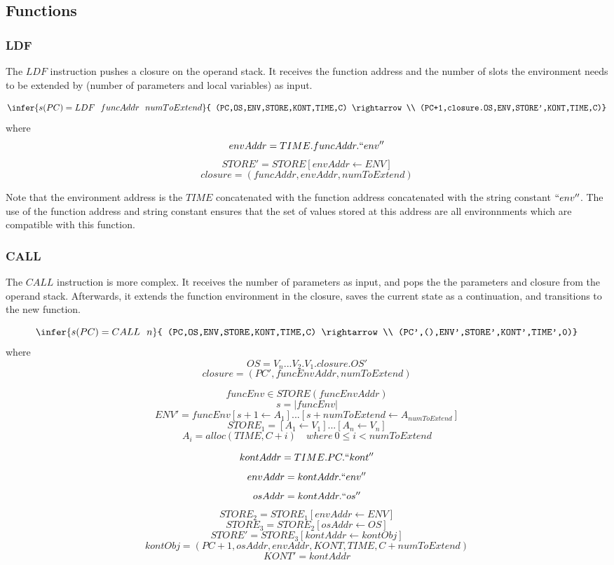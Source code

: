 \documentclass[12pt]{article}
\begin{document}
\subsection{Functions}
\subsubsection{LDF}
The $LDF$ instruction pushes a closure on the operand stack. It receives the function address and the number of slots the environment needs to be extended by (number of parameters and local variables) as input.

$$\infer{s(PC) = LDF\ \ funcAddr\ \ numToExtend}{
    (PC,OS,ENV,STORE,KONT,TIME,C) \rightarrow \\
    (PC+1,closure.OS,ENV,STORE',KONT,TIME,C)}$$
where
$$envAddr=TIME.funcAddr.``env''$$
$$STORE'=STORE[envAddr \leftarrow ENV]$$
$$closure=(funcAddr,envAddr,numToExtend)$$

Note that the environment address is the $TIME$ concatenated with the function address concatenated with the string constant $``env''$. The use of the function address and string constant ensures that the set of values stored at this address are all environnments which are compatible with this function.

\subsubsection{CALL}
The $CALL$ instruction is more complex. It receives the number of parameters as input, and pops the the parameters and closure from the operand stack. Afterwards, it extends the function environment in the closure, saves the current state as a continuation, and transitions to the new function.

$$\infer{s(PC) = CALL\ \ n}{
    (PC,OS,ENV,STORE,KONT,TIME,C) \rightarrow \\
    (PC',(),ENV',STORE',KONT',TIME',0)}$$
where
$$OS=V_n...V_2.V_1.closure.OS'$$
$$closure=(PC',funcEnvAddr,numToExtend)$$

$$funcEnv \in STORE(funcEnvAddr)$$
$$s=|funcEnv|$$
$$ENV'=funcEnv[s+1 \leftarrow A_1]...[s+numToExtend \leftarrow A_{numToExtend}]$$
$$STORE_1=[A_1 \leftarrow V_1]...[A_n \leftarrow V_n]$$
$$A_i=alloc(TIME,C+i) \quad where\ 0 \leq i < numToExtend$$

$$kontAddr = TIME.PC.``kont''$$
$$envAddr = kontAddr.``env''$$
$$osAddr = kontAddr.``os''$$
$$STORE_2=STORE_1[envAddr \leftarrow ENV]$$
$$STORE_3=STORE_2[osAddr \leftarrow OS]$$
$$STORE'=STORE_3[kontAddr \leftarrow kontObj]$$
$$kontObj = (PC+1,osAddr,envAddr,KONT,TIME,C+numToExtend)$$
$$KONT' = kontAddr$$
\end{document}
